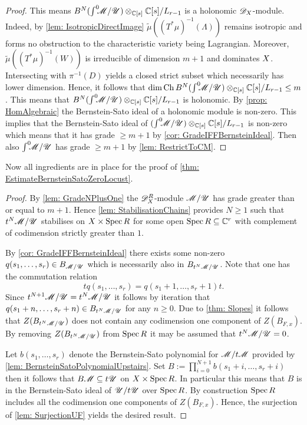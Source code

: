 \begin{proof}
  This means $B^N(\int^0 \mkern -8mu\mathscr{M}/ \mathscr{U})\otimes_{\mathbb{C}[s]}\mathbb{C}[s]/L_{r-1}$ is a holonomic $\mathscr{D}_X$-module.
  Indeed, by \cref{lem: IsotropicDirectImage} $\widetilde{\mu}((T^*\mu)^{-1}(\Lambda))$ remains isotropic and forms no obstruction to the characteristic variety being Lagrangian.
  Moreover, $\widetilde{\mu}((T^*\mu)^{-1}(W))$ is irreducible of dimension $m+1$ and dominates $X$.
  Intersecting with $\pi^{-1}(D)$ yields a closed strict subset which necessarily has lower dimension.
  Hence, it follows that $\dim \operatorname{Ch} B^N (\int^0 \mkern -8mu\mathscr{M}/ \mathscr{U})\otimes_{\mathbb{C}[s]}\mathbb{C}[s]/L_{r-1} \leq m$.
  This means that $B^N(\int^0 \mkern -8mu\mathscr{M}/ \mathscr{U})\otimes_{\mathbb{C}[s]}\mathbb{C}[s]/L_{r-1}$ is holonomic.
  By \cref{prop: HomAlgebraic} the Bernstein-Sato ideal of a holonomic module is non-zero.
  This implies that the Bernstein-Sato ideal of $(\int^0 \mkern -8mu\mathscr{M}/ \mathscr{U})\otimes_{\mathbb{C}[s]}\mathbb{C}[s]/L_{r-1}$ is non-zero which means that it has grade $\geq m+1$ by \cref{cor: GradeIFFBernsteinIdeal}.
  Then also $\int^0 \mkern -8mu\mathscr{M}/\mathscr{U}$ has grade $\geq m+1$ by \cref{lem: RestrictToCM}.
  \end{proof}
Now all ingredients are in place for the proof of \cref{thm: EstimateBernsteinSatoZeroLocust}.
\begin{proof}
  By \cref{lem: GradeNPlusOne} the $\mathscr{D}_X^R$-module $\mathscr{M}/\mathscr{U}$ has grade greater than or equal to $m + 1$.
  Hence \cref{lem: StabilisationChains} provides $N\geq 1$ such that $t^N\mathscr{M}/\mathscr{U}$ stabilises on $X\times\operatorname{Spec} R$ for some open $\operatorname{Spec} R\subseteq \mathbb{C}^r$ with complement of codimension strictly greater than $1$.

  By \cref{cor: GradeIFFBernsteinIdeal} there exists some non-zero $q(s_1,\ldots,s_r) \in B_{\mathscr{M}/\mathscr{U}}$ which is necessarily also in $B_{t^N\mathscr{M}/\mathscr{U}}$.
  Note that one has the commutation relation
  $$tq(s_1,\ldots,s_r) = q(s_1+1,\ldots, s_r + 1)t.$$
  Since $t^{N+1}\mathscr{M}/\mathscr{U} = t^N\mathscr{M}/\mathscr{U}$ it follows by iteration that $q(s_1+n,\ldots, s_r + n)\in B_{t^N \mathscr{M}/\mathscr{U}}$ for any $n\geq 0$.
  Due to \cref{thm: Slopes} it follows that $Z(B_{t^N\mathscr{M}/\mathscr{U}})$ does not contain any codimension one component of $Z(B_{F,x})$.
  By removing $Z(B_{t^N\mathscr{M}/\mathscr{U}})$ from $\operatorname{Spec} R$ it may be assumed that $t^N\mathscr{M}/\mathscr{U} = 0$.

  Let $b(s_1,\ldots,s_r)$ denote the Bernstein-Sato polynomial for $\mathscr{M}/t\mathscr{M}$ provided by \cref{lem: BernsteinSatoPolynomialUpstairs}.
  Set $B := \prod_{i=0}^{N+1} b(s_1 + i, \ldots, s_r + i)$ then it follows that
  $B\mathscr{M} \subseteq t\mathscr{U}$ on $X \times \operatorname{Spec} R$.
  In particular this means that $B$ is in the Bernstein-Sato ideal of $\mathscr{U}/t\mathscr{U}$ over $\operatorname{Spec} R$.
  By construction $\operatorname{Spec} R$ includes all the codimension one components of $Z(B_{F,x})$.
  Hence, the surjection of \cref{lem: SurjectionUF} yields the desired result.
\end{proof}
